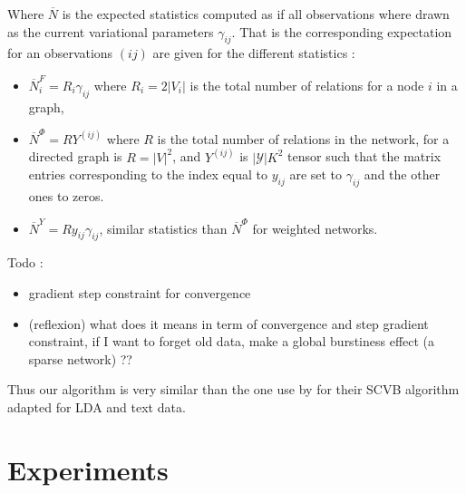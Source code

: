 Where $\overline N$ is the expected statistics computed as if all observations where drawn as the current variational parameters $\gamma_{ij}$. That is the corresponding  expectation for an observations $(ij)$  are given for the different statistics :
\begin{itemize}
    \item $\overline N^{F}_i = R_i \gamma_{ij}$ where $R_i=2|V_i|$ is the total number of relations for a node $i$ in a graph,
    \item $\overline N^{\Phi} = R Y^{(ij)}$ where $R$ is the total number of relations in the network, for a directed graph is $R=|V|^2$, and $Y^{(ij)}$ is $|\mathcal{Y}| K^2$ tensor such that the matrix entries corresponding to the index equal to $y_{ij}$ are set to $\gamma_{ij}$ and the other ones to zeros.
    \item $\overline N^Y = Ry_{ij}\gamma_{ij}$, similar statistics than  $\overline N^{\Phi}$ for weighted networks.
        
\end{itemize}

Todo :
\begin{itemize}
    \item gradient step constraint for convergence
    \item (reflexion) what does  it means in term of convergence and step gradient constraint,  if I want to forget old data, make a global burstiness effect (a sparse network) ??
\end{itemize}

Thus our algorithm is very similar than the one use by \cite{foulds2013stochastic} for their SCVB algorithm adapted for LDA and text data.


\section{Experiments}

%
